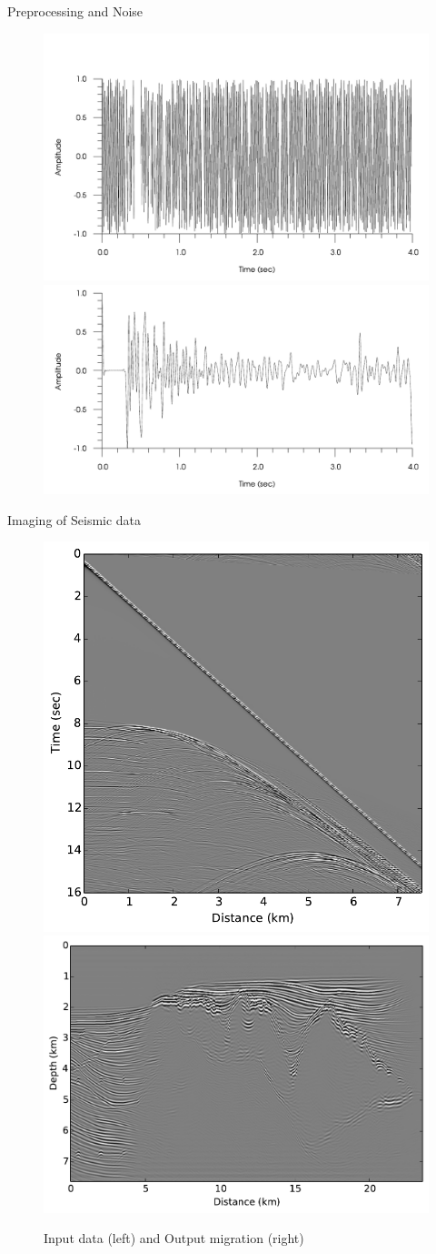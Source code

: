\documentclass[xcolor=dvipsnames,notes]{beamer}
\begin{document}
\begin{frame}{Preprocessing and Noise}
\begin{figure}
  \includegraphics[width=0.5\linewidth]{Fig/ch3-trace.pdf}
  \includegraphics[width=0.5\linewidth]{Fig/ch3-ftrace.pdf}
\end{figure}
\end{frame}
\begin{frame}{Imaging of Seismic data}
\begin{figure}
  \includegraphics[width=0.4\linewidth]{Fig/data.pdf}
  \includegraphics[width=0.4\linewidth]{Fig/mig.pdf}
  \caption{Input data (left) and Output migration (right)}
\end{figure}
\end{frame}
\end{document}
